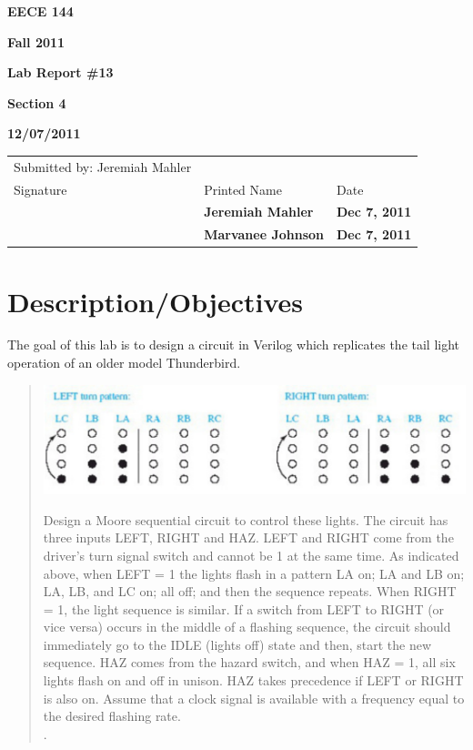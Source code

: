 \documentclass[12pt]{article}
\begin{document}
\centerline{\bf EECE 144}
\centerline{\bf Fall 2011}
\centerline{\bf}
\centerline{\bf Lab Report \#13}
\centerline{\bf Section 4}
\centerline{\bf 12/07/2011} %
\begin{center}
\begin{tabularx}{\textwidth}[b]{X l l}
Submitted by: Jeremiah Mahler & & \\
Signature & Printed Name & Date \\
\hline
\multicolumn{1}{|X|}{} & \multicolumn{1}{|l|}{\bigstrut \bf Jeremiah Mahler} & \multicolumn{1}{|l|}{\bf Dec 7, 2011} \\
\hline
\multicolumn{1}{|X|}{} & \multicolumn{1}{|l|}{\bigstrut \bf Marvanee Johnson} & \multicolumn{1}{|l|}{\bf Dec 7, 2011} \\
\hline
\end{tabularx}
\end{center}

\section{Description/Objectives}

The goal of this lab is to design a circuit in Verilog\cite{VERILOG}
which replicates the tail light operation of an older model Thunderbird.

\begin{quote}
\begin{center}
\includegraphics[scale=0.7]{thunderbird-lights}
\end{center}

Design a Moore sequential circuit to control these lights.
The circuit has three inputs LEFT, RIGHT and HAZ.  LEFT and
RIGHT come from the driver's turn signal switch and cannot be 1 at the same
time.
As indicated above, when LEFT = 1 the lights flash in a pattern LA on;
LA and LB on; LA, LB, and LC on; all off; and then the sequence repeats.
When RIGHT = 1, the light sequence is similar.
If a switch from LEFT to RIGHT (or vice versa) occurs in the middle of a flashing
sequence, the circuit should immediately go to the IDLE (lights off) state
and then, start the new sequence.  HAZ comes from the hazard switch,
and when HAZ = 1, all six lights flash on and off in unison.
HAZ takes precedence if LEFT or RIGHT is also on.
Assume that a clock signal is available with a frequency equal to the desired
flashing rate. \\
\cite[p. 547, prob. 16.27]{roth2009fundamentals}.
\end{quote}
\end{document}
